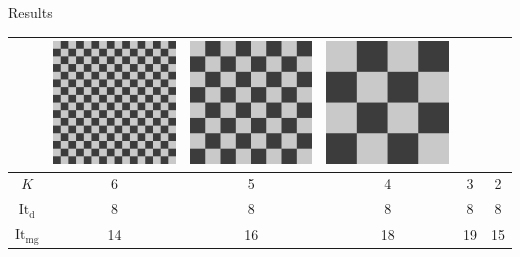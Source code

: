 \documentclass[final]{beamer}
\newlength{\onecolwid}
\begin{document}
\begin{frame}[t]
\begin{columns}[t]
\begin{column}{\onecolwid}
\begin{block}{Results}
\begin{table}
\begin{center}
\begin{tabular}{cccccc}
        &
    \includegraphics[scale=0.5]{images/burst_4.png}
        &
    \includegraphics[scale=0.5]{images/burst_3.png}
        &
    \includegraphics[scale=0.5]{images/burst_2.png}
    \\ \midrule
        $K$        & 6 & 5 & 4 & 3 & 2 \\%
    $\text{It}_{\text{d}}$   & 8 & 8 & 8 & 8 & 8 \\%
    $\text{It}_{\text{mg}}$  & 14& 16& 18& 19& 15\\%
    \bottomrule
    \end{tabular}
\end{center}
\end{table}


\end{block}
\end{column}
\end{columns}
\end{frame}
\end{document}
